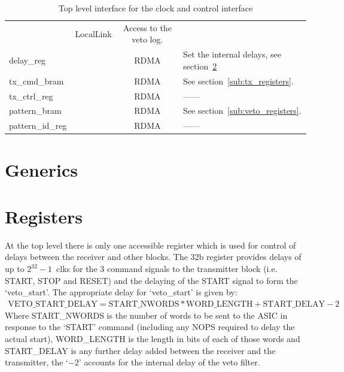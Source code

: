 \documentclass[]{report}
\newcommand*{\dittostraight}{---\textquotedbl---} %
\begin{document}
\begin{table}
\begin{center}
\begin{tabulary}{\textwidth}{l | c | c | L}
                                   & LocalLink & Access to the veto log.                                         \\
                delay\_reg       & & RDMA      & Set the internal delays, see section~\ref{sub:top_registers}    \\
                tx\_cmd\_bram    & & RDMA      & See section~\ref{sub:tx_registers}.                             \\
                tx\_ctrl\_reg    & & RDMA      & \dittostraight                                                  \\
                pattern\_bram    & & RDMA      & See section~\ref{sub:veto_registers}.                           \\
                pattern\_id\_reg & & RDMA      & \dittostraight                                                  \\
            \end{tabulary}
        \end{center}
        \caption{Top level interface for the clock and control interface}
        \label{tab:top_ccc_interface}
    \end{table}
    \section{Generics} %
    \label{sub:top_generics}
    \section{Registers} %
    \label{sub:top_registers}
    At the top level there is only one accessible register which is used for control of delays between the receiver and other blocks. The 32b register provides delays of up to \( 2^{32} - 1 \)~clks for the 3 command signals to the transmitter block (i.e. START, STOP and RESET) and the delaying of the START signal to form the `veto\_start'. The appropriate delay for `veto\_start' is given by:
    \begin{align}\label{equ:veto_start_delay}
        \text{VETO\_START\_DELAY} = \text{START\_NWORDS} * \text{WORD\_LENGTH} + \text{START\_DELAY} - 2 
    \end{align}
    Where START\_NWORDS is the number of words to be sent to the ASIC in response to the `START' command (including any NOPS required to delay the actual start), WORD\_LENGTH is the length in bits of each of those words and START\_DELAY is any further delay added between the receiver and the transmitter, the `\(- 2\)' accounts for the internal delay of the veto filter. %
    
\end{document}
